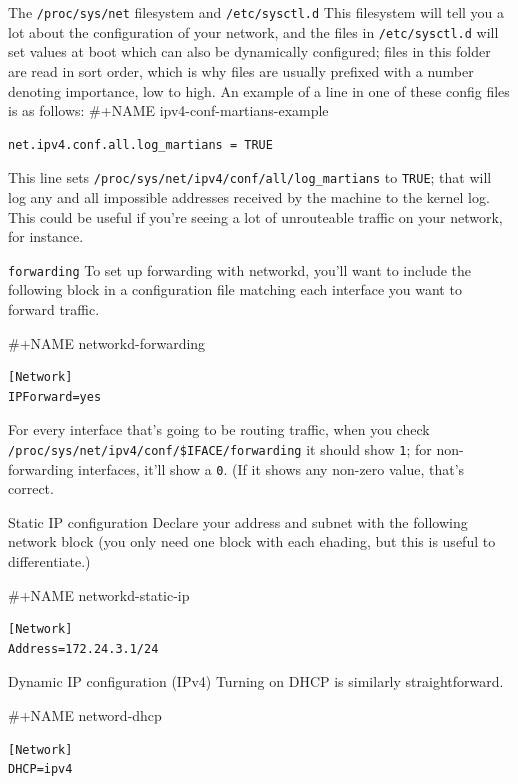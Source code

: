 \documentclass[bigger]{beamer}
\begin{document}
\begin{frame}[fragile,label={sec:org6f2d154}]{The \texttt{/proc/sys/net} filesystem and \texttt{/etc/sysctl.d}}
     This filesystem will tell you a lot about the configuration of your network,
    and the files in \texttt{/etc/sysctl.d} will set values at boot which can also be
    dynamically configured; files in this folder are read in sort order, which
    is why files are usually prefixed with a number denoting importance, low to
    high. An example of a line in one of these config files is as follows:
\#+NAME ipv4-conf-martians-example
\begin{verbatim}
net.ipv4.conf.all.log_martians = TRUE
\end{verbatim}

This line sets \texttt{/proc/sys/net/ipv4/conf/all/log\_martians} to \texttt{TRUE}; that will
log any and all impossible addresses received by the machine to the kernel
log. This could be useful if you're seeing a lot of unrouteable traffic on your
network, for instance.

\begin{block}{\texttt{forwarding}}
To set up forwarding with networkd, you'll want to include the following
block in a configuration file matching each interface you want to forward
traffic.

\#+NAME networkd-forwarding
\begin{verbatim}
[Network]
IPForward=yes
\end{verbatim}

For every interface that's going to be routing traffic, when you check
\texttt{/proc/sys/net/ipv4/conf/\$IFACE/forwarding} it should show \texttt{1}; for
non-forwarding interfaces, it'll show a \texttt{0}. (If it shows any non-zero
value, that's correct.
\end{block}

\begin{block}{Static IP configuration}
Declare your address and subnet with the following network block (you only
need one block with each ehading, but this is useful to differentiate.)

\#+NAME networkd-static-ip
\begin{verbatim}
[Network]
Address=172.24.3.1/24
\end{verbatim}
\end{block}

\begin{block}{Dynamic IP configuration (IPv4)}
Turning on DHCP is similarly straightforward.

\#+NAME netword-dhcp
\begin{verbatim}
[Network]
DHCP=ipv4
\end{verbatim}
\end{block}
\end{frame}
\end{document}
